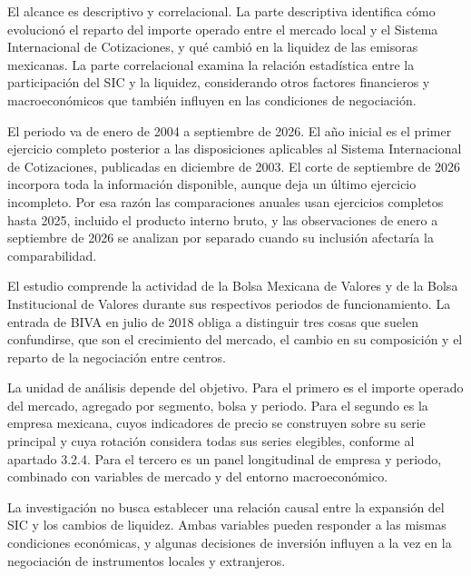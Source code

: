 El alcance es descriptivo y correlacional. La parte descriptiva identifica cómo evolucionó el reparto del importe operado entre el mercado local y el Sistema Internacional de Cotizaciones, y qué cambió en la liquidez de las emisoras mexicanas. La parte correlacional examina la relación estadística entre la participación del SIC y la liquidez, considerando otros factores financieros y macroeconómicos que también influyen en las condiciones de negociación.

El periodo va de enero de 2004 a septiembre de 2026. El año inicial es el primer ejercicio completo posterior a las disposiciones aplicables al Sistema Internacional de Cotizaciones, publicadas en diciembre de 2003. El corte de septiembre de 2026 incorpora toda la información disponible, aunque deja un último ejercicio incompleto. Por esa razón las comparaciones anuales usan ejercicios completos hasta 2025, incluido el producto interno bruto, y las observaciones de enero a septiembre de 2026 se analizan por separado cuando su inclusión afectaría la comparabilidad.

El estudio comprende la actividad de la Bolsa Mexicana de Valores y de la Bolsa Institucional de Valores durante sus respectivos periodos de funcionamiento. La entrada de BIVA en julio de 2018 obliga a distinguir tres cosas que suelen confundirse, que son el crecimiento del mercado, el cambio en su composición y el reparto de la negociación entre centros.

La unidad de análisis depende del objetivo. Para el primero es el importe operado del mercado, agregado por segmento, bolsa y periodo. Para el segundo es la empresa mexicana, cuyos indicadores de precio se construyen sobre su serie principal y cuya rotación considera todas sus series elegibles, conforme al apartado 3.2.4. Para el tercero es un panel longitudinal de empresa y periodo, combinado con variables de mercado y del entorno macroeconómico.

La investigación no busca establecer una relación causal entre la expansión del SIC y los cambios de liquidez. Ambas variables pueden responder a las mismas condiciones económicas, y algunas decisiones de inversión influyen a la vez en la negociación de instrumentos locales y extranjeros.


